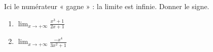 \documentclass[11pt,a4paper]{article}
\begin{document}
\begin{exercice}
Ici le numérateur « gagne » : la limite est infinie. Donner le signe.
\begin{enumerate}[label=\alph*),leftmargin=2em,itemsep=3pt]
  \item $\displaystyle\lim_{x\to+\infty}\frac{x^3+1}{2x+1}$
  \item $\displaystyle\lim_{x\to+\infty}\frac{-x^4}{3x^2+1}$
\end{enumerate}
\end{exercice}
\end{document}
